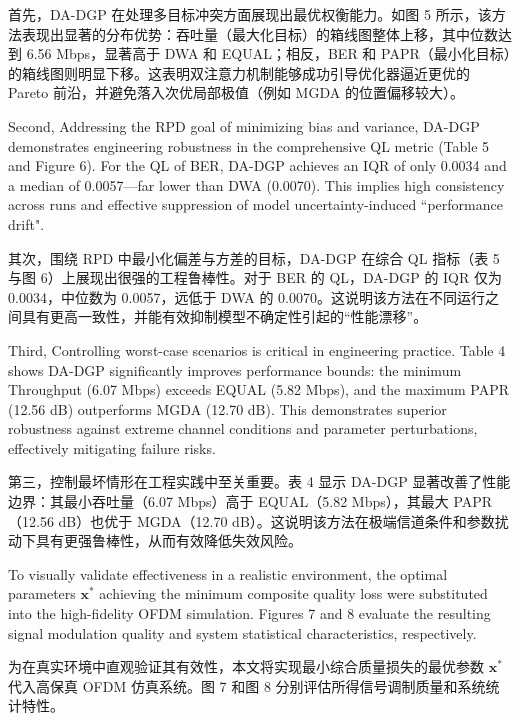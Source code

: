 \documentclass[11pt]{article}
\begin{document}
首先，DA-DGP 在处理多目标冲突方面展现出最优权衡能力。如图 5 所示，该方法表现出显著的分布优势：吞吐量（最大化目标）的箱线图整体上移，其中位数达到 6.56 Mbps，显著高于 DWA 和 EQUAL；相反，BER 和 PAPR（最小化目标）的箱线图则明显下移。这表明双注意力机制能够成功引导优化器逼近更优的 Pareto 前沿，并避免落入次优局部极值（例如 MGDA 的位置偏移较大）。

Second, Addressing the RPD goal of minimizing bias and variance, DA-DGP demonstrates engineering robustness in the comprehensive QL metric (Table 5 and Figure 6). For the QL of BER, DA-DGP achieves an IQR of only 0.0034 and a median of 0.0057—far lower than DWA (0.0070). This implies high consistency across runs and effective suppression of model uncertainty-induced ``performance drift".

其次，围绕 RPD 中最小化偏差与方差的目标，DA-DGP 在综合 QL 指标（表 5 与图 6）上展现出很强的工程鲁棒性。对于 BER 的 QL，DA-DGP 的 IQR 仅为 0.0034，中位数为 0.0057，远低于 DWA 的 0.0070。这说明该方法在不同运行之间具有更高一致性，并能有效抑制模型不确定性引起的“性能漂移”。


Third, Controlling worst-case scenarios is critical in engineering practice. Table 4 shows DA-DGP significantly improves performance bounds: the minimum Throughput (6.07 Mbps) exceeds EQUAL (5.82 Mbps), and the maximum PAPR (12.56 dB) outperforms MGDA (12.70 dB). This demonstrates superior robustness against extreme channel conditions and parameter perturbations, effectively mitigating failure risks.

第三，控制最坏情形在工程实践中至关重要。表 4 显示 DA-DGP 显著改善了性能边界：其最小吞吐量（6.07 Mbps）高于 EQUAL（5.82 Mbps），其最大 PAPR（12.56 dB）也优于 MGDA（12.70 dB）。这说明该方法在极端信道条件和参数扰动下具有更强鲁棒性，从而有效降低失效风险。

To visually validate effectiveness in a realistic environment, the optimal parameters $\mathbf{x}^{*}$ achieving the minimum composite quality loss were substituted into the high-fidelity OFDM simulation. Figures 7 and 8 evaluate the resulting signal modulation quality and system statistical characteristics, respectively.

为在真实环境中直观验证其有效性，本文将实现最小综合质量损失的最优参数 $\mathbf{x}^{*}$ 代入高保真 OFDM 仿真系统。图 7 和图 8 分别评估所得信号调制质量和系统统计特性。
\end{document}

